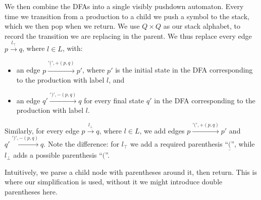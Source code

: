 \documentclass[acmsmall,review,anonymous]{acmart}\settopmatter{printfolios=true,printccs=false,printacmref=false}
\newcommand{\Labels}{L} %
\newcommand{\reqpl}{\underline{(}}
\newcommand{\reqpr}{)}
\newcommand{\pospl}{(}
\newcommand{\pospr}{)}
\begin{document}
\noindent We then combine the DFAs into a single visibly pushdown automaton. Every time we transition from a production to a child we push a symbol to the stack, which we then pop when we return. We use $Q \times Q$ as our stack alphabet, to record the transition we are replacing in the parent. We thus replace every edge $p \xrightarrow{l_\top} q$, where $l \in \Labels$, with:

\begin{itemize}
  \item an edge $p \xrightarrow{'\reqpl', +(p, q)} p'$, where $p'$ is the initial state in the DFA corresponding to the production with label $l$, and
  \item an edge $q' \xrightarrow{'\reqpr', -(p, q)} q$ for every final state $q'$ in the DFA corresponding to the production with label $l$.
\end{itemize}

\noindent Similarly, for every edge $p \xrightarrow{l_\bot} q$, where $l \in \Labels$, we add edges $p \xrightarrow{'\pospl', +(p, q)} p'$ and $q' \xrightarrow{'\pospr', -(p, q)} q$. Note the difference: for $l_\top$ we add a required parenthesis ``$\reqpl$'', while $l_\bot$ adds a possible parenthesis ``$\pospl$''.

Intuitively, we parse a child node with parentheses around it, then return. This is where our simplification is used, without it we might introduce double parentheses here.

\begin{center}
\end{center}
\end{document}
